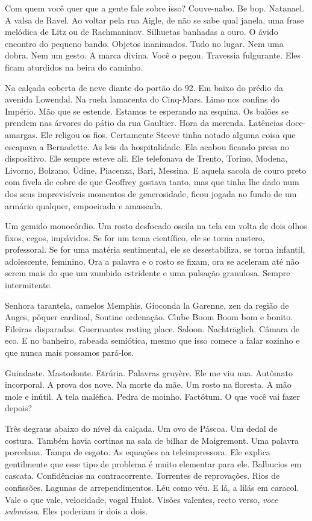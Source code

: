 Com quem você quer que a gente fale sobre isso? Couve-nabo. Be bop.
Natanael. A valsa de Ravel. Ao voltar pela rua Aigle, de não se sabe
qual janela, uma frase melódica de Litz ou de Rachmaninov. Silhuetas
banhadas a ouro. O ávido encontro do pequeno bando. Objetos inanimados.
Tudo no lugar. Nem uma dobra. Nem um gesto. A marca divina. Você o
pegou. Travessia fulgurante. Eles ficam aturdidos na beira do caminho.

Na calçada coberta de neve diante do portão do 92. Em baixo do prédio da
avenida Lowendal. Na ruela lamacenta do Cinq-Mars. Limo nos confins do
Império. Mão que se estende. Estamos te esperando na esquina. Os balões
se prendem nas árvores do pátio da rua Gaultier. Hora da merenda.
Latências doce-amargas. Ele religou os fios. Certamente Steeve tinha
notado alguma coisa que escapava a Bernadette. As leis da hospitalidade.
Ela acabou ficando presa no dispositivo. Ele sempre esteve ali. Ele
telefonava de Trento, Torino, Modena, Livorno, Bolzano, Údine, Piacenza,
Bari, Messina. E aquela sacola de couro preto com fivela de cobre de que
Geoffrey gostava tanto, mas que tinha lhe dado num dos seus
imprevisíveis momentos de generosidade, ficou jogada no fundo de um
armário qualquer, empoeirada e amassada.

Um gemido monocórdio. Um rosto desfocado oscila na tela em volta de dois
olhos fixos, cegos, impávidos. Se for um tema científico, ele se torna
austero, professoral. Se for uma matéria sentimental, ele se
desestabiliza, se torna infantil, adolescente, feminino. Ora a palavra e
o rosto se fixam, ora se aceleram até não serem mais do que um zumbido
estridente e uma pulsação granulosa. Sempre intermitente.

Senhora tarantela, camelos Memphis, Gioconda la Garenne, zen da região
de Auges, pôquer cardinal, Soutine ordenação. Clube Boom Boom bom e
bonito. Fileiras disparadas. Guermantes resting place. Saloon.
Nachträglich. Câmara de eco. E no banheiro, rabeada semiótica, mesmo que
isso comece a falar sozinho e que nunca mais possamos pará-los.

Guindaste. Mastodonte. Etrúria. Palavras gruyère. Ele me viu nua.
Autômato incorporal. A prova dos nove. Na morte da mãe. Um rosto na
floresta. A mão mole e inútil. A tela maléfica. Pedra de moinho.
Factótum. O que você vai fazer depois?

Três degraus abaixo do nível da calçada. Um ovo de Páscoa. Um dedal de
costura. Também havia cortinas na sala de bilhar de Maigremont. Uma
palavra porcelana. Tampa de esgoto. As equações na teleimpressora. Ele
explica gentilmente que esse tipo de problema é muito elementar para
ele. Balbucios em cascata. Confidências na contracorrente. Torrentes de
reprovações. Rios de confissões. Lagunas de arrependimentos. Léu como
véu. E lá, a lilás em caracol. Vale o que vale, velocidade, vogal Hulot.
Visões valentes, recto verso, \emph{voce submissa}. Eles poderiam ir
dois a dois.

